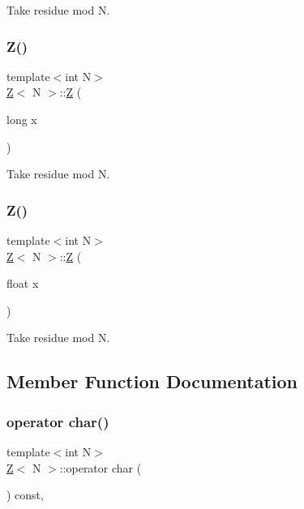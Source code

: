 Take residue mod N. 

\mbox{\label{classZ_a55fa70d38bc723f35e27139239bf385a}} 
\subsubsection{\texorpdfstring{Z()}{Z()}\hspace{0.1cm}{\footnotesize\ttfamily [3/4]}}
{\footnotesize\ttfamily template$<$int N$>$ \\
\hyperlink{classZ}{Z}$<$ N $>$\+::\hyperlink{classZ}{Z} (\begin{DoxyParamCaption}\item[{long}]{x }\end{DoxyParamCaption})\hspace{0.3cm}{\ttfamily [inline]}}



Take residue mod N. 

\mbox{\label{classZ_a32b7b05c9f2e161d1b9fc60dd1e7a27b}} 
\subsubsection{\texorpdfstring{Z()}{Z()}\hspace{0.1cm}{\footnotesize\ttfamily [4/4]}}
{\footnotesize\ttfamily template$<$int N$>$ \\
\hyperlink{classZ}{Z}$<$ N $>$\+::\hyperlink{classZ}{Z} (\begin{DoxyParamCaption}\item[{float}]{x }\end{DoxyParamCaption})\hspace{0.3cm}{\ttfamily [inline]}}



Take residue mod N. 



\subsection{Member Function Documentation}
\mbox{\label{classZ_ae97fcd6db1faa3170e7764670b3ea1a9}} 
\subsubsection{\texorpdfstring{operator char()}{operator char()}}
{\footnotesize\ttfamily template$<$int N$>$ \\
\hyperlink{classZ}{Z}$<$ N $>$\+::operator char (\begin{DoxyParamCaption}{ }\end{DoxyParamCaption}) const\hspace{0.3cm}{\ttfamily [inline]}, {\ttfamily [explicit]}}

